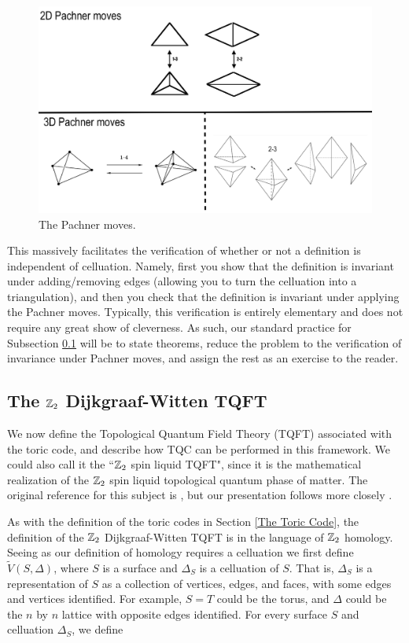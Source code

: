 \documentclass{article}
\theoremstyle{definition}
\numberwithin{figure}{section}
\begin{document}
\begin{figure}
\begin{center}
\includegraphics[scale=0.2]{all-moves}
\caption{The Pachner moves.}
\label{fig:all-moves}
\end{center}
\end{figure}


This massively facilitates the verification of whether or not a definition is independent of celluation. Namely, first you show that the definition is invariant under adding/removing edges (allowing you to turn the celluation into a triangulation), and then you check that the definition is invariant under applying the Pachner moves. Typically, this verification is entirely elementary and does not require any great show of cleverness. As such, our standard practice for  Subsection \ref{DW TQFT} will be to state theorems, reduce the problem to the verification of invariance under Pachner moves, and assign the rest as an exercise to the reader.

\subsection{The $\mathbb{Z}_2$ Dijkgraaf-Witten TQFT}
\label{DW TQFT}

We now define the Topological Quantum Field Theory (TQFT) associated with the toric code, and describe how TQC can be performed in this framework. We could also call it the ``$\mathbb{Z}_2$ spin liquid TQFT", since it is the mathematical realization of the $\mathbb{Z}_2$ spin liquid topological quantum phase of matter. The original reference for this subject is \cite{dijkgraaf1990topological}, but our presentation follows more closely \cite{qiu2021representations}.

As with the definition of the toric codes in Section \ref{The Toric Code}, the definition of the $\mathbb{Z}_2$ Dijkgraaf-Witten TQFT is in the language of $\mathbb{Z}_2$ homology. Seeing as our definition of homology requires a celluation we first define $\tilde{V}(S,\Delta)$, where $S$ is a surface and $\Delta_S$ is a celluation of $S$. That is, $\Delta_S$ is a representation of $S$ as a collection of vertices, edges, and faces, with some edges and vertices identified. For example, $S=T$ could be the torus, and $\Delta$ could be the $n$ by $n$ lattice with opposite edges identified. For every surface $S$ and celluation $\Delta_S$, we define
\end{document}
